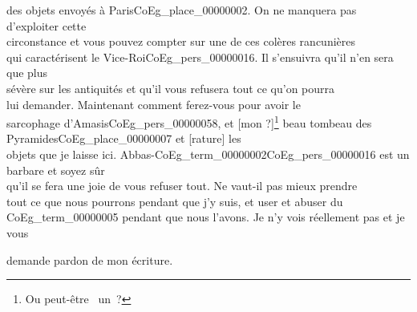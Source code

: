 \documentclass{book}
\begin{document}
des objets envoyés à Paris\gls{CoEg_place_00000002}. On ne manquera pas d’exploiter cette\\
circonstance et vous pouvez compter sur une de ces colères rancunières\\
qui caractérisent le Vice-Roi\gls{CoEg_pers_00000016}. Il s’ensuivra qu’il n’en sera que plus\\
sévère sur les antiquités et qu’il vous refusera tout ce qu’on pourra\\
lui demander. Maintenant comment ferez-vous pour avoir le\\
sarcophage d’Amasis\gls{CoEg_pers_00000058}, et {[mon ?]}\footnote{Ou peut-être \og ~un~\fg ?} beau tombeau des Pyramides\gls{CoEg_place_00000007} et [rature] les\\
objets que je laisse ici. Abbas-\Gls{CoEg_term_00000002}\gls{CoEg_pers_00000016} est un barbare et soyez sûr\\
qu’il se fera une joie de vous refuser tout. Ne vaut-il pas mieux prendre\\
tout ce que nous pourrons pendant que j’y suis, et user et abuser du\\
\gls{CoEg_term_00000005} pendant que nous l’avons. Je n’y vois réellement pas et je vous
\begin{flushright}demande pardon de mon écriture.\end{flushright}
\end{document}
